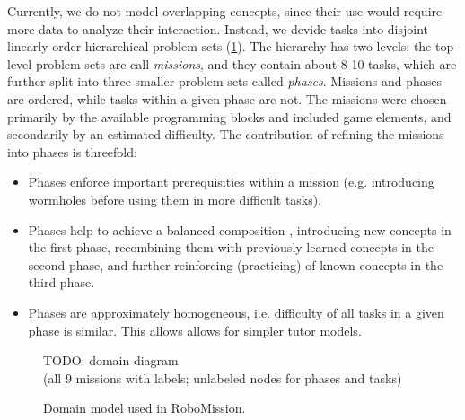 Currently, we do not model overlapping concepts, since their use would require
more data to analyze their interaction.
Instead, we devide tasks into disjoint linearly order hierarchical problem
sets (\cref{fig:robomission.domain}). %
The hierarchy has two levels: the top-level problem sets are call \emph{missions},
and they contain about 8-10 tasks, which are further split into three smaller
problem sets called \emph{phases}.
Missions and phases are ordered, while tasks within a given phase are not.
The missions were chosen primarily by the available programming blocks and
included game elements, and secondarily by an estimated difficulty.
The contribution of refining the missions into phases is threefold:
\begin{itemize}
\item Phases enforce important prerequisities within a mission (e.g.
introducing wormholes before using them in more difficult tasks).
\item Phases help to achieve a balanced composition \cite{progression-analysis},
  introducing new concepts in the first phase,
  recombining them with previously learned concepts in the second phase,
  and further reinforcing (practicing) of known concepts in the third phase.
\item Phases are approximately homogeneous, i.e. difficulty of all tasks in a
  given phase is similar. This allows allows for simpler tutor models.
\end{itemize}

\begin{figure}[htb]
\centering
TODO: domain diagram\\
(all 9 missions with labels; unlabeled nodes for phases and tasks)
\caption{Domain model used in RoboMission.}
\label{fig:robomission.domain}
\end{figure}


